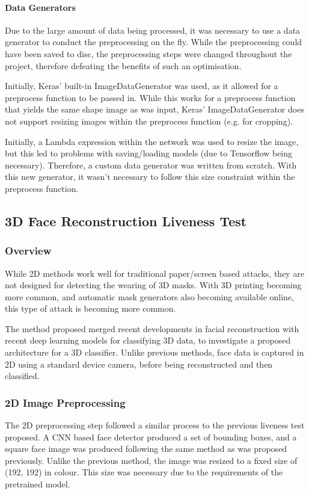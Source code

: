 \documentclass[10pt,a4paper]{article}
\begin{document}
            \paragraph{Data Generators}
                Due to the large amount of data being processed, it was necessary to use a data generator to conduct the preprocessing on the fly. While the preprocessing
                could have been saved to disc, the preprocessing steps were changed throughout the project, therefore defeating the benefits of such an optimisation.

                Initially, Keras' built-in ImageDataGenerator was used, as it allowed for a preprocess function to be passed in. While this works for a preprocess function that yields the same shape image
                as was input, Keras' ImageDataGenerator does not support resizing images within the preprocess function (e.g. for cropping).

                Initially, a Lambda expression within the network was used to resize the image, but this led to problems with saving/loading models (due to Tensorflow being necessary).
                Therefore, a custom data generator was written from scratch. With this new generator, it wasn't necessary to follow this size constraint within the preprocess function.


    \subsection{3D Face Reconstruction Liveness Test}
        \subsubsection{Overview}
            While 2D methods work well for traditional paper/screen based attacks, they are not designed for detecting the wearing of 3D masks. With 3D printing
            becoming more common, and automatic mask generators also becoming available online, this type of attack is becoming more common.

            The method proposed merged recent developments in facial reconstruction with recent deep learning models for classifying 3D data, to investigate a proposed
            architecture for a 3D classifier. Unlike previous methods, face data is captured in 2D using a standard device camera, before being reconstructed and then classified.

        \subsubsection{2D Image Preprocessing}
            The 2D preprocessing step followed a similar process to the previous liveness test proposed. A CNN based face detector produced a set of bounding boxes, and a square face image was produced
            following the same method as was proposed previously. Unlike the previous method, the image was resized to a fixed size of (192, 192) in colour. This size was necessary due to the requirements
            of the pretrained model.
\end{document}
